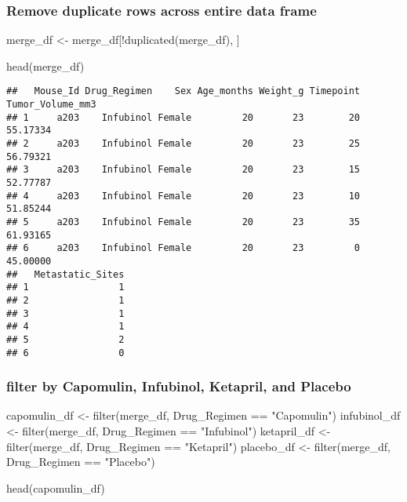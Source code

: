 \documentclass[
]{article}
\newenvironment{Shaded}{\begin{snugshade}}{\end{snugshade}}
\newcommand{\FunctionTok}[1]{\textcolor[rgb]{0.00,0.00,0.00}{#1}}
\newcommand{\NormalTok}[1]{#1}
\newcommand{\OtherTok}[1]{\textcolor[rgb]{0.56,0.35,0.01}{#1}}
\newcommand{\SpecialCharTok}[1]{\textcolor[rgb]{0.00,0.00,0.00}{#1}}
\newcommand{\StringTok}[1]{\textcolor[rgb]{0.31,0.60,0.02}{#1}}
\begin{document}
\hypertarget{remove-duplicate-rows-across-entire-data-frame}{%
\subsubsection{Remove duplicate rows across entire data
frame}\label{remove-duplicate-rows-across-entire-data-frame}}

\begin{Shaded}
\begin{Highlighting}[]
\NormalTok{merge\_df }\OtherTok{\textless{}{-}}\NormalTok{ merge\_df[}\SpecialCharTok{!}\FunctionTok{duplicated}\NormalTok{(merge\_df), ]}

\FunctionTok{head}\NormalTok{(merge\_df)}
\end{Highlighting}
\end{Shaded}

\begin{verbatim}
##   Mouse_Id Drug_Regimen    Sex Age_months Weight_g Timepoint Tumor_Volume_mm3
## 1     a203    Infubinol Female         20       23        20         55.17334
## 2     a203    Infubinol Female         20       23        25         56.79321
## 3     a203    Infubinol Female         20       23        15         52.77787
## 4     a203    Infubinol Female         20       23        10         51.85244
## 5     a203    Infubinol Female         20       23        35         61.93165
## 6     a203    Infubinol Female         20       23         0         45.00000
##   Metastatic_Sites
## 1                1
## 2                1
## 3                1
## 4                1
## 5                2
## 6                0
\end{verbatim}

\hypertarget{filter-by-capomulin-infubinol-ketapril-and-placebo}{%
\subsubsection{filter by Capomulin, Infubinol, Ketapril, and
Placebo}\label{filter-by-capomulin-infubinol-ketapril-and-placebo}}

\begin{Shaded}
\begin{Highlighting}[]
\NormalTok{capomulin\_df }\OtherTok{\textless{}{-}} \FunctionTok{filter}\NormalTok{(merge\_df, Drug\_Regimen }\SpecialCharTok{==} \StringTok{"Capomulin"}\NormalTok{)}
\NormalTok{infubinol\_df }\OtherTok{\textless{}{-}} \FunctionTok{filter}\NormalTok{(merge\_df, Drug\_Regimen }\SpecialCharTok{==} \StringTok{"Infubinol"}\NormalTok{)}
\NormalTok{ketapril\_df }\OtherTok{\textless{}{-}} \FunctionTok{filter}\NormalTok{(merge\_df, Drug\_Regimen }\SpecialCharTok{==} \StringTok{"Ketapril"}\NormalTok{)}
\NormalTok{placebo\_df }\OtherTok{\textless{}{-}} \FunctionTok{filter}\NormalTok{(merge\_df, Drug\_Regimen }\SpecialCharTok{==} \StringTok{"Placebo"}\NormalTok{)}


\FunctionTok{head}\NormalTok{(capomulin\_df)}
\end{Highlighting}
\end{Shaded}
\end{document}
